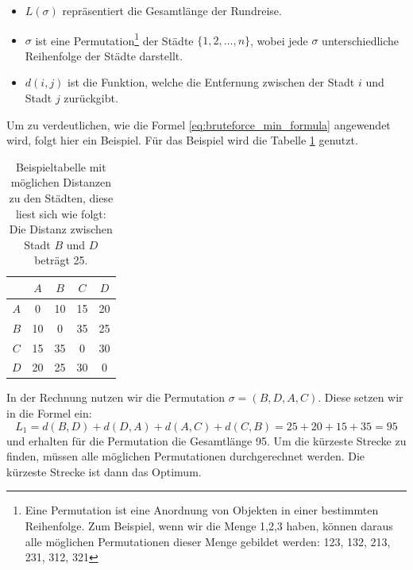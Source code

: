 \begin{itemize}
    \item \( L(\sigma) \) repräsentiert die Gesamtlänge der Rundreise.
    \item \( \sigma \) ist eine Permutation\footnote{
              Eine Permutation ist eine Anordnung von Objekten in einer bestimmten Reihenfolge.
              Zum Beispiel, wenn wir die Menge {1,2,3} haben, können daraus alle möglichen 
              Permutationen dieser Menge gebildet werden: 123, 132, 213, 231, 312, 321 
          }
          der Städte \( \{1, 2, \ldots, n\} \),
          wobei jede \( \sigma \) unterschiedliche Reihenfolge der Städte darstellt.
    \item \( d(i, j) \) ist die Funktion, welche die Entfernung zwischen der Stadt \( i \) und
          Stadt \( j \) zurückgibt.
\end{itemize}
\begin{beispiel}
    \label{buch:paper:varalg:subsection:bruteforce_calculate}
    Um zu verdeutlichen, wie die Formel \eqref{eq:bruteforce_min_formula}
    angewendet wird, folgt hier ein Beispiel. Für das Beispiel wird die Tabelle 
    \ref{tab:example_bruteforce_cities} genutzt.
    \begin{table}
        \centering
        \begin{tabular}{|c|c|c|c|c|}
            \hline
                & $A$ & $B$ & $C$ & $D$ \\ \hline
            $A$ & 0   & 10  & 15  & 20  \\ \hline
            $B$ & 10  & 0   & 35  & 25  \\ \hline
            $C$ & 15  & 35  & 0   & 30  \\ \hline
            $D$ & 20  & 25  & 30  & 0   \\ \hline
        \end{tabular}
        \caption{
            Beispieltabelle mit möglichen Distanzen zu den Städten, diese liest sich wie folgt:
            Die Distanz zwischen Stadt $B$ und $D$ beträgt 25.
        }
        \label{tab:example_bruteforce_cities}
    \end{table}
    In der Rechnung nutzen wir die Permutation $\sigma = (B, D, A, C)$.
    Diese setzen wir in die Formel ein:
    \begin{equation}
        L_1 = d(B, D) + d(D, A) + d(A, C) + d(C, B)
        =
        25 + 20 + 15 + 35 = 95
        \label{eq:bruteforce_min_formula_example}
    \end{equation}
    und erhalten für die Permutation die Gesamtlänge 95. Um die kürzeste Strecke zu finden,
    müssen alle möglichen Permutationen durchgerechnet werden. Die kürzeste Strecke ist dann
    das Optimum. 
\end{beispiel}
